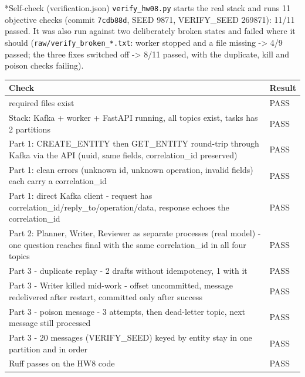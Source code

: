 \documentclass[11pt]{article}
\makeatletter
\renewcommand\section{\@startsection{section}{1}{\z@}{-3.0ex \@plus -1ex \@minus -.2ex}{1.2ex \@plus.2ex}{\normalfont\fontsize{14}{17}\selectfont\bfseries}}
\makeatother
\begin{document}
\section*{Self-check (verification.json)}
\texttt{verify\_\allowbreak{}hw08.py} starts the real stack and runs 11 objective checks (commit \texttt{7cdb88d}, SEED 9871, VERIFY\_SEED 269871): 11/11 passed. It was also run against two deliberately broken states and failed where it should (\texttt{raw/\allowbreak{}verify\_\allowbreak{}broken\_\allowbreak{}*.txt}: worker stopped and a file missing -> 4/9 passed; the three fixes switched off -> 8/11 passed, with the duplicate, kill and poison checks failing).

\begin{center}
{\footnotesize\setlength{\tabcolsep}{3pt}
\begin{tabular}{p{5.4in}l}
\toprule
\textbf{Check} & \textbf{Result} \\
\midrule
required files exist & PASS \\
Stack: Kafka + worker + FastAPI running, all topics exist, tasks has 2 partitions & PASS \\
Part 1: CREATE\_ENTITY then GET\_ENTITY round-trip through Kafka via the API (uuid, same fields, correlation\_id preserved) & PASS \\
Part 1: clean errors (unknown id, unknown operation, invalid fields) each carry a correlation\_id & PASS \\
Part 1: direct Kafka client - request has correlation\_id/reply\_to/operation/data, response echoes the correlation\_id & PASS \\
Part 2: Planner, Writer, Reviewer as separate processes (real model) - one question reaches final with the same correlation\_id in all four topics & PASS \\
Part 3 - duplicate replay - 2 drafts without idempotency, 1 with it & PASS \\
Part 3 - Writer killed mid-work - offset uncommitted, message redelivered after restart, committed only after success & PASS \\
Part 3 - poison message - 3 attempts, then dead-letter topic, next message still processed & PASS \\
Part 3 - 20 messages (VERIFY\_SEED) keyed by entity stay in one partition and in order & PASS \\
Ruff passes on the HW8 code & PASS \\
\bottomrule
\end{tabular}}
\end{center}
\end{document}
